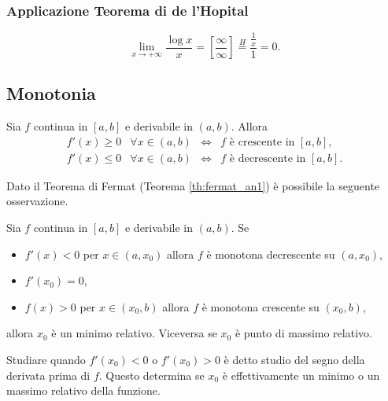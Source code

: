\subsubsection{Applicazione Teorema di de l'Hopital}
\begin{example}
    \begin{equation*}
        \lim_{x\rightarrow+\infty}\frac{\log x}{x}=\left[\frac{\infty}{\infty}\right]\overset{H}{=}\frac{\frac{1}{x}}{1}=0.
    \end{equation*}
\end{example}

\subsection{Monotonia}

\begin{theorem}
    Sia $f$ continua in $[a,b]$ e derivabile in $(a,b)$. Allora
    \begin{equation*}
        \begin{matrix}
            f'(x)\geq 0 &\forall x\in(a,b)& \iff & f \text{ è crescente in } [a,b],\\
            f'(x)\leq 0 &\forall x\in(a,b)& \iff & f \text{ è decrescente in } [a,b].
        \end{matrix}
    \end{equation*}
\end{theorem}

Dato il Teorema di Fermat (Teorema \ref{th:fermat_an1}) è possibile la seguente osservazione.

\begin{remark}\label{rem:minimo_relativo}
    Sia $f$ continua in $[a,b]$ e derivabile in $(a,b)$. Se
    \begin{itemize}
        \item $f'(x)<0$ per $x\in(a,x_0)$ allora $f$ è monotona decrescente su $(a,x_0)$,
        \item $f'(x_0)=0$,
        \item $f(x)>0$ per $x\in(x_0,b)$ allora $f$ è monotona crescente su $(x_0,b)$,
    \end{itemize}
    allora $x_0$ è un minimo relativo. Viceversa se $x_0$ è punto di massimo relativo.
\end{remark}

Studiare quando $f'(x_0)<0$ o $f'(x_0)>0$ è detto studio del segno della derivata prima di $f$. Questo determina se $x_0$ è effettivamente un minimo o un massimo relativo della funzione.

